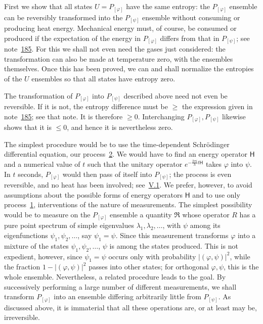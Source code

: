 \documentclass[fontsize=13pt,twoside,openany,headings=normal,parskip=false,bookmarkpackage=false,DIV=calc]{scrbook}
\begin{document}
First we show that all states $U=P_{[\varphi]}$ have the same entropy: the $P_{[\varphi]}$ ensemble can be reversibly transformed into the $P_{[\psi]}$ ensemble without consuming or producing heat energy. Mechanical energy must, of course, be consumed or produced if the expectation of the energy in $P_{[\varphi]}$ differs from that in $P_{[\psi]}$; see note~\hyperlink{note-185}{185}. For this we shall not even need the gases just considered: the transformation can also be made at temperature zero, with the ensembles themselves. Once this has been proved, we can and shall normalize the entropies of the $U$ ensembles so that all states have entropy zero.

The transformation of $P_{[\varphi]}$ into $P_{[\psi]}$ described above need not even be reversible. If it is not, the entropy difference must be $\geq$ the expression given in note~\hyperlink{note-185}{185}; see that note. It is therefore $\geq0$. Interchanging $P_{[\varphi]},P_{[\psi]}$ likewise shows that it is $\leq0$, and hence it is nevertheless zero.

The simplest procedure would be to use the time-dependent Schr\"odinger differential equation, our process~\hyperref[eq:V.1.2]{2}. We would have to find an energy operator $\mathsf{H}$ and a numerical value of $t$ such that the unitary operator $e^{-\frac{2\pi i}{h}t\mathsf{H}}$ takes $\varphi$ into $\psi$. In $t$ seconds, $P_{[\varphi]}$ would then pass of itself into $P_{[\psi]}$; the process is even reversible, and no heat has been involved; see~\hyperref[sec:V.1]{V.1}. We prefer, however, to avoid assumptions about the possible forms of energy operators $\mathsf{H}$ and to use only process~\hyperref[eq:V.1.1]{1}, interventions of the nature of measurements. The simplest possibility would be to measure on the $P_{[\varphi]}$ ensemble a quantity $\mathfrak R$ whose operator $R$ has a pure point spectrum of simple eigenvalues $\lambda_1,\lambda_2,\ldots$, with $\psi$ among its eigenfunctions $\psi_1,\psi_2,\ldots$, say $\psi_1=\psi$. Since this measurement transforms $\varphi$ into a mixture of the states $\psi_1,\psi_2,\ldots$, $\psi$ is among the states produced. This is not expedient, however, since $\psi_1=\psi$ occurs only with probability $|(\varphi,\psi)|^2$, while the fraction $1-|(\varphi,\psi)|^2$ passes into other states; for orthogonal $\varphi,\psi$, this is the whole ensemble. Nevertheless, a related
\hypertarget{origpage-195}{}%
procedure leads to the goal. By successively performing a large number of different measurements, we shall transform $P_{[\varphi]}$ into an ensemble differing arbitrarily little from $P_{[\psi]}$. As discussed above, it is immaterial that all these operations are, or at least may be, irreversible.
\end{document}
